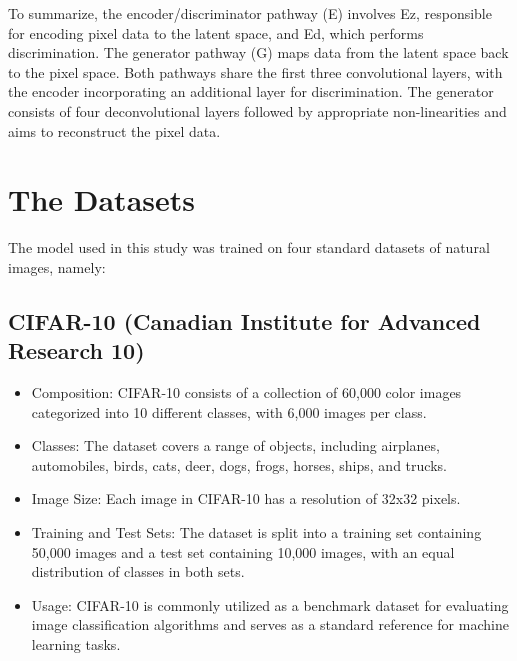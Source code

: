 \documentclass{midl} %
\begin{document}
To summarize, the encoder/discriminator pathway (E) involves Ez, responsible for encoding pixel data to the latent space, and Ed, which performs discrimination. The generator pathway (G) maps data from the latent space back to the pixel space. Both pathways share the first three convolutional layers, with the encoder incorporating an additional layer for discrimination. The generator consists of four deconvolutional layers followed by appropriate non-linearities and aims to reconstruct the pixel data.



\section{The Datasets}

The model used in this study was trained on four standard datasets of natural images, namely:

\subsection{CIFAR-10 (Canadian Institute for Advanced Research 10)}
\begin{itemize}
  \item Composition: CIFAR-10 consists of a collection of 60,000 color images categorized into 10 different classes, with 6,000 images per class.
  \item Classes: The dataset covers a range of objects, including airplanes, automobiles, birds, cats, deer, dogs, frogs, horses, ships, and trucks.
  \item Image Size: Each image in CIFAR-10 has a resolution of 32x32 pixels.
  \item Training and Test Sets: The dataset is split into a training set containing 50,000 images and a test set containing 10,000 images, with an equal distribution of classes in both sets.
  \item Usage: CIFAR-10 is commonly utilized as a benchmark dataset for evaluating image classification algorithms and serves as a standard reference for machine learning tasks.
\end{itemize}
\end{document}

